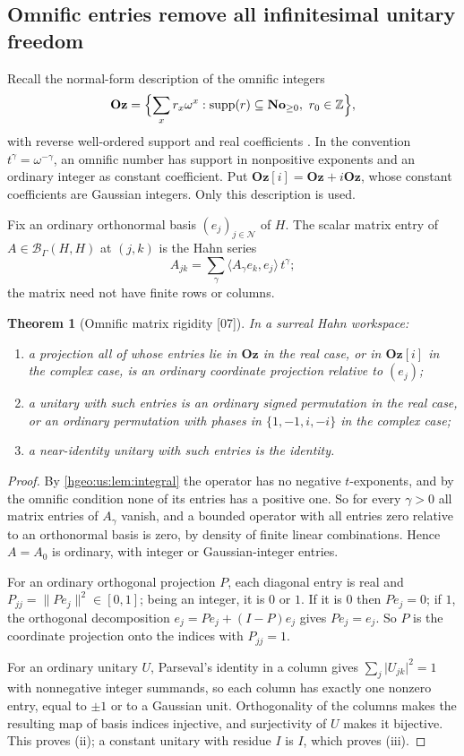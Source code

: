 \documentclass[11pt,letterpaper]{article}
\numberwithin{equation}{section}
\newtheorem{theorem}{Theorem}[section]
\theoremstyle{definition}
\theoremstyle{remark}
\newcommand{\Z}{\mathbb Z}
\newcommand{\No}{\mathbf{No}}
\newcommand{\BH}{\mathscr B_\Gamma(H,H)}
\newcommand{\supp}{\operatorname{supp}}
\newcommand{\ip}[2]{\langle #1,#2\rangle}
\newcommand{\norm}[1]{\lVert #1\rVert}
\newcommand{\abs}[1]{\lvert #1\rvert}
\newcommand{\src}[1]{\textup{\textsf{\small[#1]}}}
\newcommand{\Oz}{\mathbf{Oz}}
\begin{document}
\subsection{Omnific entries remove all infinitesimal unitary freedom}
Recall the normal-form description of the omnific integers
\[
 \Oz=\Bigl\{\sum_xr_x\omega^x:\supp(r)\subseteq\No_{\ge0},\ r_0\in\Z\Bigr\},
\]
with reverse well-ordered support and real coefficients
\cite{Conway,LInnocenteMantova}. In the convention $t^\gamma=\omega^{-\gamma}$,
an omnific number has support in nonpositive exponents and an ordinary
integer as constant coefficient. Put $\Oz[i]=\Oz+i\Oz$, whose constant
coefficients are Gaussian integers. Only this description is used.

Fix an ordinary orthonormal basis $(e_j)_{j\in\mathcal N}$ of $H$. The scalar
matrix entry of $A\in\BH$ at $(j,k)$ is the Hahn series
\[
 A_{jk}=\sum_\gamma\ip{A_\gamma e_k}{e_j}\,t^\gamma ;
\]
the matrix need not have finite rows or columns.

\begin{theorem}[Omnific matrix rigidity \src{07}]\label{hgeo:us:thm:omnific}
In a surreal Hahn workspace:
\begin{enumerate}[label=\textup{(\roman*)}]
\item a projection all of whose entries lie in $\Oz$ in the real case, or in
$\Oz[i]$ in the complex case, is an ordinary coordinate projection relative
to $(e_j)$;
\item a unitary with such entries is an ordinary signed permutation in the
real case, or an ordinary permutation with phases in $\{1,-1,i,-i\}$ in the
complex case;
\item a near-identity unitary with such entries is the identity.
\end{enumerate}
\end{theorem}
\begin{proof}
By \cref{hgeo:us:lem:integral} the operator has no negative $t$-exponents,
and by the omnific condition none of its entries has a positive one. So for
every $\gamma>0$ all matrix entries of $A_\gamma$ vanish, and a bounded
operator with all entries zero relative to an orthonormal basis is zero, by
density of finite linear combinations. Hence $A=A_0$ is ordinary, with
integer or Gaussian-integer entries.

For an ordinary orthogonal projection $P$, each diagonal entry is real and
$P_{jj}=\norm{Pe_j}^2\in[0,1]$; being an integer, it is $0$ or $1$. If it is
$0$ then $Pe_j=0$; if $1$, the orthogonal decomposition
$e_j=Pe_j+(I-P)e_j$ gives $Pe_j=e_j$. So $P$ is the coordinate projection onto
the indices with $P_{jj}=1$.

For an ordinary unitary $U$, Parseval's identity in a column gives
$\sum_j\abs{U_{jk}}^2=1$ with nonnegative integer summands, so each column has
exactly one nonzero entry, equal to $\pm1$ or to a Gaussian unit. Orthogonality
of the columns makes the resulting map of basis indices injective, and
surjectivity of $U$ makes it bijective. This proves (ii); a constant unitary
with residue $I$ is $I$, which proves (iii).
\end{proof}
\end{document}
